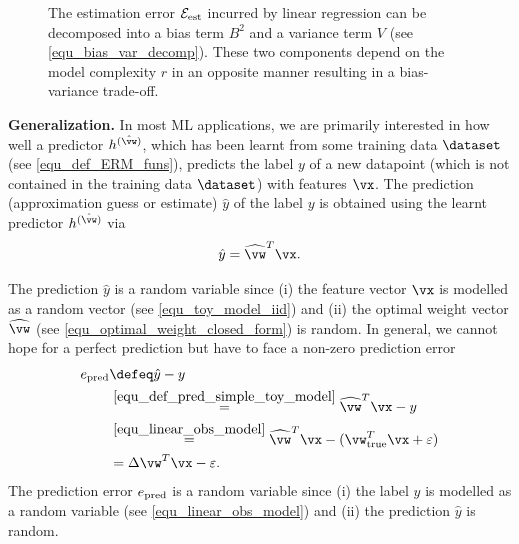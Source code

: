 \documentclass[12pt]{report}
\begin{document}
\begin{figure}
\begin{center}
\end{center}
\caption{The estimation error $\mathcal{E}_{\rm est}$ incurred by linear 
	regression can be decomposed into a bias term $B^{2}$ and a variance 
	term $V$ (see \eqref{equ_bias_var_decomp}). These two components 
	depend on the model complexity $r$ in an opposite manner resulting in 
	a bias-variance trade-off.}
\label{fig_bias_variance}
\end{figure}


{\bf Generalization.}
In most ML applications, we are primarily interested in how well a 
predictor $h^{(\hat{\vw})}$, which has been learnt from some 
training data $\dataset$ (see \eqref{equ_def_ERM_funs}), predicts 
the label $y$ of a new datapoint (which is not contained in the training data $\dataset$) 
with features $\vx$. The prediction (approximation guess or estimate) 
$\hat{y}$ of the label $y$ is obtained using the learnt 
predictor $h^{(\hat{\vw})}$ via  
\begin{equation}
\label{equ_def_pred_simple_toy_model}
\hat{y} = \widehat{\vw}^{T} \vx. 
\end{equation} 

The prediction $\hat{y}$ is a random variable since (i) the feature vector 
$\vx$ is modelled as a random vector (see \eqref{equ_toy_model_iid}) 
and (ii) the optimal weight vector $\widehat{\vw}$ (see \eqref{equ_optimal_weight_closed_form}) 
is random. In general, we cannot hope for a perfect prediction 
but have to face a non-zero prediction error 
\begin{align}
\label{equ_def_pred_error}
e_{\rm pred} & \defeq \hat{y} - y \nonumber \\ 
& \stackrel{\eqref{equ_def_pred_simple_toy_model}}{=}\widehat{\vw}^{T} \vx - y \nonumber \\ 
& \stackrel{\eqref{equ_linear_obs_model}}{=} \widehat{\vw}^{T} \vx - (\vw_{\rm true}^{T}  \vx + \varepsilon) \nonumber \\ 
& = \Delta \vw^{T}  \vx - \varepsilon.
\end{align} 
The prediction error $e_{\rm pred}$ is a random variable since (i) the 
label $y$ is modelled as a random variable (see \eqref{equ_linear_obs_model}) 
and (ii) the prediction $\hat{y}$ is random. 
\end{document}

